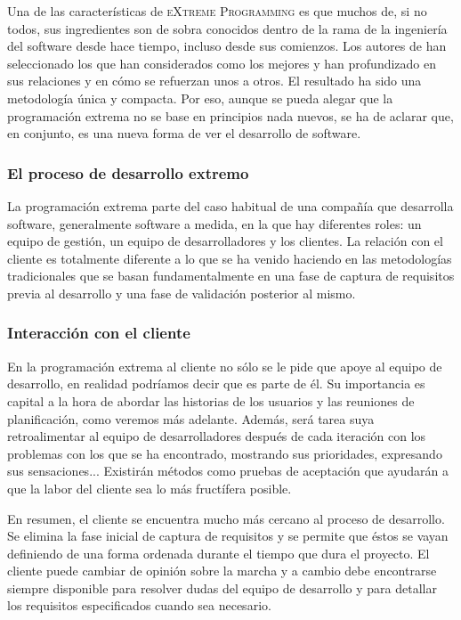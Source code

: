 \documentclass[12pt]{book} %
\begin{document}
		Una de las características de \textsc{eXtreme Programming} es que muchos de, si no todos, sus ingredientes son de sobra conocidos
		dentro de la rama de la ingeniería del software desde hace tiempo, incluso desde sus comienzos. Los autores de han seleccionado los
		que han considerados como los mejores y han profundizado en sus relaciones y en cómo se refuerzan unos a otros. El resultado ha sido
		una metodología única y compacta. Por eso, aunque se pueda alegar que la programación extrema no se base en	principios nada nuevos,
		se ha de aclarar que, en conjunto, es una nueva forma de ver el desarrollo de software. 
		
		\subsubsection{El proceso de desarrollo extremo}
			La programación extrema parte del caso habitual de una compañía que desarrolla software, generalmente software a medida, en la
			que hay diferentes roles: un equipo de gestión, un equipo de desarrolladores y los clientes. La relación con el cliente es
			totalmente diferente a lo que se ha venido haciendo en las metodologías tradicionales que se basan fundamentalmente en una fase
			de captura de requisitos previa al desarrollo y una fase de validación posterior al mismo. 
			
		\subsubsection{Interacción con el cliente }
			En la programación extrema al cliente no sólo se le pide que apoye al equipo de desarrollo, en realidad podríamos decir que es
			parte de él. Su importancia es capital a la hora de abordar las historias de los usuarios y las reuniones de planificación, como
			veremos más adelante. Además, será tarea suya retroalimentar al equipo de desarrolladores después de cada iteración con los
			problemas con los que se ha encontrado, mostrando sus prioridades, expresando sus sensaciones... Existirán métodos como pruebas
			de aceptación que ayudarán a que la labor del cliente sea lo más fructífera posible.
			
			
			En resumen, el cliente se encuentra mucho más cercano al proceso de desarrollo. Se elimina la fase inicial de captura de
			requisitos y se permite que éstos se vayan definiendo de una forma ordenada durante el tiempo que dura el proyecto. 
			El cliente puede cambiar de opinión sobre la marcha y a cambio debe encontrarse siempre disponible para resolver dudas del
			equipo de desarrollo y para detallar los requisitos especificados cuando sea necesario. 
			
\end{document}
